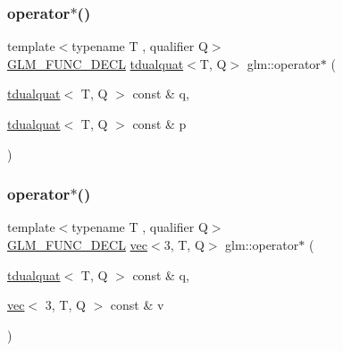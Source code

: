 \mbox{\label{group__gtx__dual__quaternion_ga01828eee9e1cf1f56e4018fcdc910aa0}} 
\subsubsection{\texorpdfstring{operator$\ast$()}{operator*()}\hspace{0.1cm}{\footnotesize\ttfamily [1/7]}}
{\footnotesize\ttfamily template$<$typename T , qualifier Q$>$ \\
\mbox{\hyperlink{setup_8hpp_ab2d052de21a70539923e9bcbf6e83a51}{G\+L\+M\+\_\+\+F\+U\+N\+C\+\_\+\+D\+E\+CL}} \mbox{\hyperlink{structglm_1_1tdualquat}{tdualquat}}$<$T, Q$>$ glm\+::operator$\ast$ (\begin{DoxyParamCaption}\item[{\mbox{\hyperlink{structglm_1_1tdualquat}{tdualquat}}$<$ T, Q $>$ const \&}]{q,  }\item[{\mbox{\hyperlink{structglm_1_1tdualquat}{tdualquat}}$<$ T, Q $>$ const \&}]{p }\end{DoxyParamCaption})}

\mbox{\label{group__gtx__dual__quaternion_ga3489c5fcf23fd302ef3713f443585cbd}} 
\subsubsection{\texorpdfstring{operator$\ast$()}{operator*()}\hspace{0.1cm}{\footnotesize\ttfamily [2/7]}}
{\footnotesize\ttfamily template$<$typename T , qualifier Q$>$ \\
\mbox{\hyperlink{setup_8hpp_ab2d052de21a70539923e9bcbf6e83a51}{G\+L\+M\+\_\+\+F\+U\+N\+C\+\_\+\+D\+E\+CL}} \mbox{\hyperlink{structglm_1_1vec}{vec}}$<$3, T, Q$>$ glm\+::operator$\ast$ (\begin{DoxyParamCaption}\item[{\mbox{\hyperlink{structglm_1_1tdualquat}{tdualquat}}$<$ T, Q $>$ const \&}]{q,  }\item[{\mbox{\hyperlink{structglm_1_1vec}{vec}}$<$ 3, T, Q $>$ const \&}]{v }\end{DoxyParamCaption})}

